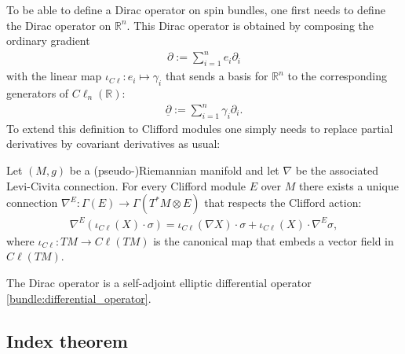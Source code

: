     To be able to define a Dirac operator on spin bundles, one first needs to define the Dirac operator on $\mathbb{R}^n$. This Dirac operator is obtained by composing the ordinary gradient
    \begin{gather}
        \partial:=\sum_{i=1}^ne_i\partial_i
    \end{gather}
    with the linear map $\iota_{C\ell}:e_i\mapsto\gamma_i$ that sends a basis for $\mathbb{R}^n$ to the corresponding generators of $C\ell_n(\mathbb{R})$:
    \begin{gather}
        \label{riemann:dirac_operator_R}
        \underline{\partial} := \sum_{i=1}^n\gamma_i\partial_i.
    \end{gather}
    To extend this definition to Clifford modules one simply needs to replace partial derivatives by covariant derivatives as usual:
    \begin{property}
        Let $(M,g)$ be a (pseudo-)Riemannian manifold and let $\nabla$ be the associated Levi-Civita connection. For every Clifford module $E$ over $M$ there exists a unique connection $\nabla^E:\Gamma(E)\rightarrow \Gamma(T^*M\otimes E)$ that respects the Clifford action:
        \begin{gather}
            \nabla^E(\iota_{C\ell}(X)\cdot\sigma) = \iota_{C\ell}(\nabla X)\cdot\sigma + \iota_{C\ell}(X)\cdot\nabla^E\sigma,
        \end{gather}
        where $\iota_{C\ell}:TM\rightarrow C\ell(TM)$ is the canonical map that embeds a vector field in $C\ell(TM)$.
    \end{property}

    \begin{property}[Ellipticity]
        The Dirac operator is a self-adjoint elliptic differential operator \ref{bundle:differential_operator}.
    \end{property}

\subsection{Index theorem}


